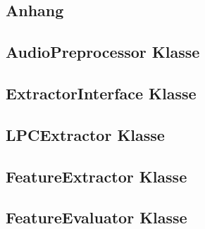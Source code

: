 \begin{appendix}
  \section{Anhang}
  \subsection{AudioPreprocessor Klasse}
  

  \subsection{ExtractorInterface Klasse}
  

  \subsection{LPCExtractor Klasse}
  

  \subsection{FeatureExtractor Klasse}
  

  \subsection{FeatureEvaluator Klasse}
  

\end{appendix}